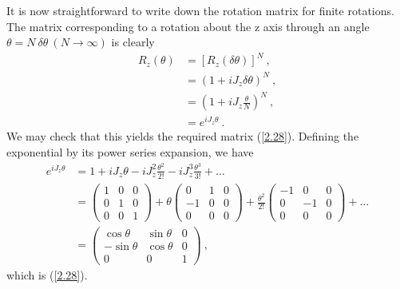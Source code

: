 \documentclass[12pt,a4paper]{report}
\begin{document}
It is now straightforward to write down the rotation matrix for finite rotations. The matrix corresponding to a rotation about the z axis through an angle $\theta=N~\delta\theta~(N\longrightarrow\infty)$ is clearly \cite{balki}
\begin{align}
     R_z(\theta)&=[R_z(\delta\theta)]^N~,\nonumber\\
     &=(1+iJ_z\delta\theta)^N~,\nonumber\\
     &=\left(1+iJ_z\frac{\theta}{N}\right)^N~,\nonumber\\
     &=e^{iJ_z\theta}~.
\end{align}
We may check that this yields the required matrix (\eqref{2.28}). Defining the exponential by its power series expansion, we have 
\begin{align}
    e^{iJ_z\theta}&=1+iJ_z\theta-iJ_z^2\frac{\theta^2}{2!}-iJ_z^3\frac{\theta^3}{3!}+\dots\\
    &=\begin{pmatrix}
    1&0&0\\
    0&1&0\\
    0&0&1
\end{pmatrix}+\theta\begin{pmatrix}
    0&1&0\\
    -1&0&0\\
    0&0&0
\end{pmatrix}+\frac{\theta^2}{2!}\begin{pmatrix}
    -1&0&0\\
    0&-1&0\\
    0&0&0
\end{pmatrix}+\dots\\
&=\begin{pmatrix}
  \cos{\theta} & \sin{\theta} & 0\\ 
  -\sin{\theta} & \cos{\theta} & 0\\
  0 & 0 & 1
\end{pmatrix}~,
\end{align}
which is (\eqref{2.28}).
\end{document}
